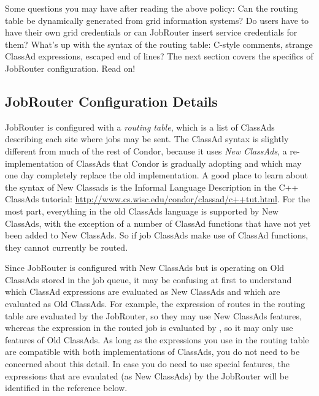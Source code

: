 Some questions you may have after reading the above policy: Can the
routing table be dynamically generated from grid information systems?
Do users have to have their own grid credentials or can JobRouter
insert service credentials for them?  What's up with the syntax of the
routing table: C-style comments, strange ClassAd expressions, escaped
end of lines?  The next section covers the specifics of JobRouter
configuration.  Read on!

\subsection{JobRouter Configuration Details}

JobRouter is configured with a \textit{routing table}, which is a list
of ClassAds describing each site where jobs may be sent.  The ClassAd
syntax is slightly different from much of the rest of Condor, because
it uses \emph{New ClassAds}, a re-implementation of ClassAds that
Condor is gradually adopting and which may one day completely replace
the old implementation.  A good place to learn about the syntax of New
Classads is the Informal Language Description in the C++ ClassAds
tutorial: \url{http://www.cs.wisc.edu/condor/classad/c++tut.html}.
For the most part, everything in the old ClassAds language is
supported by New ClassAds, with the exception of a number of ClassAd
functions that have not yet been added to New ClassAds.  So if job
ClassAds make use of ClassAd functions, they cannot currently be
routed.

Since JobRouter is configured with New ClassAds but is operating on
Old ClassAds stored in the job queue, it may be confusing at first to
understand which ClassAd expressions are evaluated as New ClassAds and
which are evaluated as Old ClassAds.  For example, the
 expression of routes in the routing table are
evaluated by the JobRouter, so they may use New ClassAds features,
whereas the  expression in the routed job is
evaluated by , so it may only use features of Old
ClassAds.  As long as the expressions you use in the routing table are
compatible with both implementations of ClassAds, you do not need to
be concerned about this detail.  In case you do need to use special
features, the expressions that are evaulated (as New ClassAds) by the
JobRouter will be identified in the reference below.

